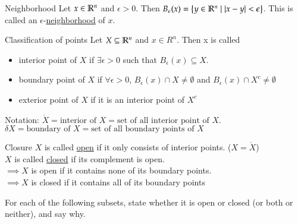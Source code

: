 

\begin{defn}{Neighborhood}
  Let $x\in \mathbb{R}^n$ and $\epsilon > 0$. Then $B_\epsilon (x) = \left\{ y\in \mathbb{R}^n \mid |x-y|<\epsilon \right\}$. This is called an $\epsilon$-\ul{neighborhood} of $x$.
\end{defn}
\begin{defn}{Classification of points}
  Let $X\subseteq \mathbb{R}^n$ and $x\in R^n$. Then x is called
  \begin{itemize}
    \item interior point of $X$ if $\exists \epsilon > 0$ such that $B_\epsilon (x) \subseteq X$.
    \item boundary point of $X$ if $\forall \epsilon > 0$, $B_\epsilon (x) \cap X \neq \emptyset$ and $B_\epsilon (x) \cap X^c \neq \emptyset$
    \item exterior point of $X$ if it is an interior point of $X^c$
  \end{itemize}
  Notation: $\mathring{X} = \text{interior of }X = \text{set of all interior point of }X$.
  $\delta X = \text{boundary of }X = \text{set of all boundary points of }X$
\end{defn}
\begin{defn}{Closure}
  $X$ is called \ul{open} if it only consists of interior points. ($X=\mathring{X}$) \\
  $X$ is called \ul{closed} if its complement is open. \\
  $\implies X$ is open if it contains none of its boundary points. \\
  $\implies X$ is closed if it contains all of its boundary points
\end{defn}

For each of the following subsets, state whether it is open or closed (or both or neither), and say why.

